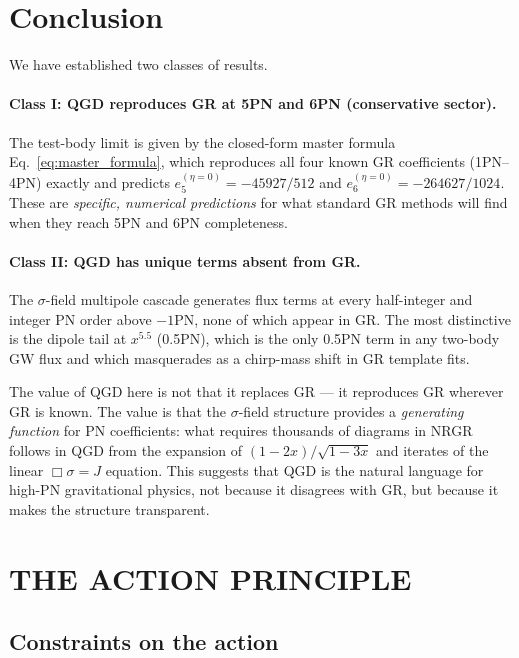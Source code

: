 \documentclass[11pt,a4paper]{article}
\theoremstyle{definition}
\theoremstyle{remark}
\begin{document}
	
	\section{Conclusion}
	\label{sec:conclusion}
	
	We have established two classes of results.
	
	\paragraph{Class I: QGD reproduces GR at 5PN and 6PN (conservative sector).}
	The test-body limit is given by the closed-form master formula
	Eq.~\eqref{eq:master_formula}, which reproduces all four known
	GR coefficients (1PN--4PN) exactly and predicts
	$e_5^{(\eta=0)}=-45927/512$ and $e_6^{(\eta=0)}=-264627/1024$.
	These are \emph{specific, numerical predictions} for what standard
	GR methods will find when they reach 5PN and 6PN completeness.
	
	\paragraph{Class II: QGD has unique terms absent from GR.}
	The $\sigma$-field multipole cascade generates flux terms at every
	half-integer and integer PN order above $-1$PN, none of which appear
	in GR.  The most distinctive is the dipole tail at $x^{5.5}$ (0.5PN),
	which is the only 0.5PN term in any two-body GW flux and which
	masquerades as a chirp-mass shift in GR template fits.
	
	The value of QGD here is not that it replaces GR — it reproduces GR
	wherever GR is known.  The value is that the $\sigma$-field structure
	provides a \emph{generating function} for PN coefficients: what
	requires thousands of diagrams in NRGR follows in QGD from the
	expansion of $(1-2x)/\sqrt{1-3x}$ and iterates of the linear
	$\Box\sigma=J$ equation.  This suggests that QGD is the natural
	language for high-PN gravitational physics, not because it disagrees
	with GR, but because it makes the structure transparent.
	
	
	\section{THE ACTION PRINCIPLE}
	\label{sec:action}
	
	\subsection{Constraints on the action}
	
\end{document}
